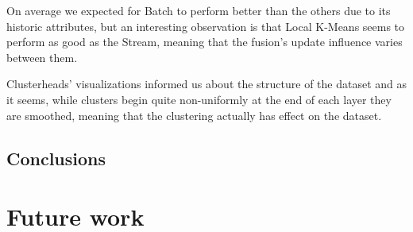 \documentclass{lmproj}
\begin{document}
On average we expected for Batch to perform better than the others due to its historic attributes, but an interesting observation is that Local K-Means seems to perform as good as the Stream, meaning that the fusion's update influence varies between them.

Clusterheads' visualizations informed us about the structure of the dataset and as it seems, while clusters begin quite non-uniformly at the end of each layer they are smoothed, meaning that the clustering actually has effect on the dataset. 

\section{Conclusions}
\label{conclusions}




\chapter{Future work}
\label{future_work}




\nocite{*}
\end{document}
